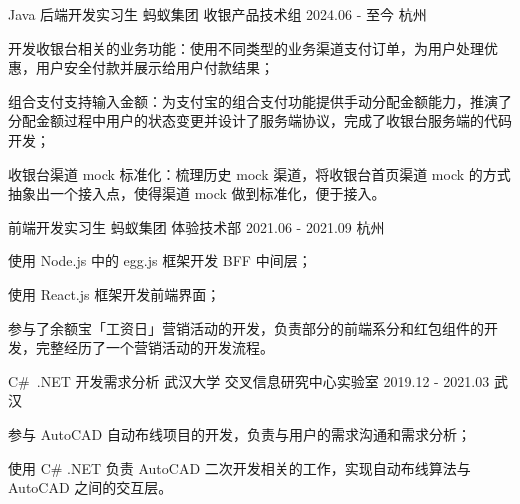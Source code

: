 

\begin{cventries}

  \cventry
    {Java 后端开发实习生} %
    {蚂蚁集团 \quad 收银产品技术组} %
    {2024.06 - 至今} %
    {杭州} %
    {
      \begin{cvitems} %
        \item {开发收银台相关的业务功能：使用不同类型的业务渠道支付订单，为用户处理优惠，用户安全付款并展示给用户付款结果；}
        \item {组合支付支持输入金额：为支付宝的组合支付功能提供手动分配金额能力，推演了分配金额过程中用户的状态变更并设计了服务端协议，完成了收银台服务端的代码开发；}
        \item {收银台渠道 mock 标准化：梳理历史 mock 渠道，将收银台首页渠道 mock 的方式抽象出一个接入点，使得渠道 mock 做到标准化，便于接入。}
      \end{cvitems}
    }

  \cventry
    {前端开发实习生} %
    {蚂蚁集团 \quad 体验技术部} %
    {2021.06 - 2021.09} %
    {杭州} %
    {
      \begin{cvitems} %
        \item {使用 Node.js 中的 egg.js 框架开发 BFF 中间层；}
        \item {使用 React.js 框架开发前端界面；}
        \item {参与了余额宝「工资日」营销活动的开发，负责部分的前端系分和红包组件的开发，完整经历了一个营销活动的开发流程。}
      \end{cvitems}
    }

  \cventry
    {C\#\ .NET 开发{\enskip\cdotp\enskip}需求分析} %
    {武汉大学 \quad 交叉信息研究中心实验室} %
    {2019.12 - 2021.03} %
    {武汉} %
    {
      \begin{cvitems} %
        \item {参与 AutoCAD 自动布线项目的开发，负责与用户的需求沟通和需求分析；}
        \item {使用 C\# .NET 负责 AutoCAD 二次开发相关的工作，实现自动布线算法与 AutoCAD 之间的交互层。}
      \end{cvitems}
    }

\end{cventries}
